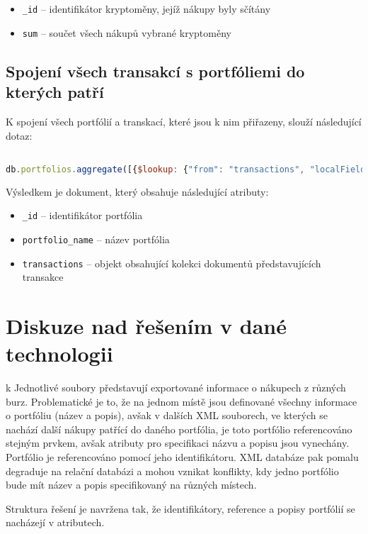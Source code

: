 \documentclass[12pt, a4paper]{article}
\let\oldsection\section
\renewcommand\section{\clearpage\oldsection}
\begin{document}
\begin{itemize}
    \item \texttt{_id} -- identifikátor kryptoměny, jejíž nákupy byly sčítány
    \item \texttt{sum} -- součet všech nákupů vybrané kryptoměny
\end{itemize}


\subsection{Spojení všech transakcí s portfóliemi do kterých patří}
K spojení všech portfólií a transkací, které jsou k nim přiřazeny, slouží následující dotaz:

\begin{lstlisting}[language=JavaScript]

db.portfolios.aggregate([{$lookup: {"from": "transactions", "localField": "_id", "foreignField": "portfolioId", "as": "transactions"}}, {$project: {"portfolio_name":"$name", "transactions":"$transactions"}}])

\end{lstlisting}
Výsledkem je dokument, který obsahuje následující atributy: 

\begin{itemize}
    \item \texttt{_id} -- identifikátor portfólia
    \item \texttt{portfolio_name} -- název portfólia
    \item \texttt{transactions} -- objekt obsahující kolekci dokumentů představujících transakce
\end{itemize}

\section{Diskuze nad řešením v dané technologii}
k
Jednotlivé soubory představují exportované informace o nákupech z různých burz. Problematické je to, že na jednom místě jsou definované všechny informace o portfóliu (název a popis), avšak v dalších XML souborech, ve kterých se nachází další nákupy patřící do daného portfólia, je toto portfólio referencováno stejným prvkem, avšak atributy pro specifikaci názvu a popisu jsou vynechány. Portfólio je referencováno pomocí jeho identifikátoru. XML databáze pak pomalu degraduje na relační databázi a mohou vznikat konflikty, kdy jedno portfólio bude mít název a popis specifikovaný na různých místech.

Struktura řešení je navržena tak, že identifikátory, reference a popisy portfólií se nacházejí v atributech. 
\end{document}
